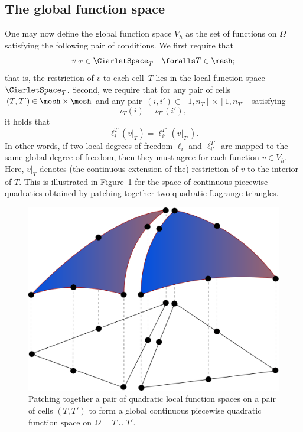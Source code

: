 \subsection{The global function space}

One may now define the global function space $V_h$ as the set of
functions on $\Omega$ satisfying the following pair of conditions. We
first require that
\begin{equation}
  v |_T \in \CiarletSpace_T \quad \foralls T \in \mesh;
\end{equation}
that is, the restriction of $v$ to each cell~$T$ lies in the local
function space~$\CiarletSpace_T$. Second, we require that for any pair
of cells $(T, T') \in \mesh \times \mesh$ and any pair~$(i, i') \in
[1,n_T] \times [1,n_{T'}]$ satisfying
\begin{equation}
  \iota_T(i) = \iota_{T'}(i'),
\end{equation}
it holds that
\begin{equation} \label{eq:constraint}
  \ell^T_i(v|_T) = \ell^{T'}_{i'}(v|_{T'}).
\end{equation}
In other words, if two local degrees of freedom $\ell_i$ and
$\ell^{T'}_{i'}$ are mapped to the same global degree of freedom, then
they must agree for each function $v \in V_h$. Here, $v|_T$ denotes
(the continuous extension of the) restriction of $v$ to the interior
of $T$. This is illustrated in Figure~\ref{fig:femspace} for the space
of continuous piecewise quadratics obtained by patching together two
quadratic Lagrange triangles.

\begin{figure}
  \center\includegraphics[width=\largefig]{chapters/kirby-7/pdf/femspace.pdf}
  \caption{Patching together a pair of quadratic local function
    spaces on a pair of cells $(T, T')$ to form a global continuous
    piecewise quadratic function space on $\Omega = T \cup T'$.}
  \label{fig:femspace}
\end{figure}

